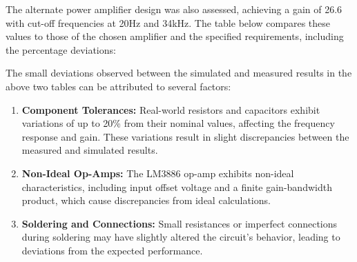 The alternate power amplifier design was also assessed, achieving a gain of 26.6 with cut-off frequencies at 20Hz and 34kHz. The table below compares these values to those of the chosen amplifier and the specified requirements, including the percentage deviations:
\begin{table}[H]
    \centering
    \captionsetup{justification=raggedright, labelfont=bf}
    \caption{Comparison of required, simulated, and measured values and deviations between the parameters for B2-2's power amplifier circuit. The deviation D$_{\text{diff},1}$ represents the difference between the simulated and required values, while D$_{\text{diff},2}$ corresponds to the difference between the measured and required values.}
\end{table}

The small deviations observed between the simulated and measured results in the above two tables can be attributed to several factors:
\begin{enumerate}
    \item \textbf{Component Tolerances:} Real-world resistors and capacitors exhibit variations of up to 20\% from their nominal values, affecting the frequency response and gain. These variations result in slight discrepancies between the measured and simulated results.
    \item \textbf{Non-Ideal Op-Amps:} The LM3886 op-amp exhibits non-ideal characteristics, including input offset voltage and a finite gain-bandwidth product, which cause discrepancies from ideal calculations.
    \item \textbf{Soldering and Connections:} Small resistances or imperfect connections during soldering may have slightly altered the circuit's behavior, leading to deviations from the expected performance.
\end{enumerate}

